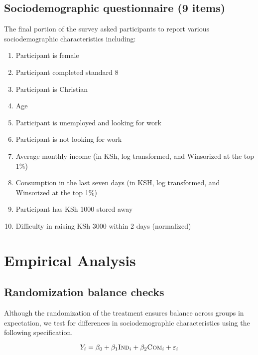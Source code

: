 \documentclass[11pt, a4paper]{article}\usepackage[]{graphicx}\usepackage[]{color}
\begin{document}
    \subsection{Sociodemographic questionnaire (9 items)}

        The final portion of the survey asked participants to report various sociodemographic characteristics including:

        \begin{enumerate}
        \itemsep0em
            \item Participant is female
            \item Participant completed standard 8
            \item Participant is Christian
            \item Age
            \item Participant is unemployed and looking for work
            \item Participant is not looking for work
            \item Average monthly income (in KSh, log transformed, and Winsorized at the top 1\%)
            \item Consumption in the last seven days (in KSH, log transformed, and Winsorized at the top 1\%)
            \item Participant has KSh 1000 stored away
            \item Difficulty in raising KSh 3000 within 2 days (normalized)
        \end{enumerate}

\section{Empirical Analysis}

    \subsection{Randomization balance checks}

        Although the randomization of the treatment ensures balance across groups in expectation, we test for differences in sociodemographic characteristics using the following specification.

        \begin{equation} \label{eq:balance}
        Y_{i} = \beta_{0} + \beta_{1}\text{\textsc{Ind}}_{i} + \beta_{2}\text{\textsc{Com}}_{i} + \varepsilon_{i}
        \end{equation}
\end{document}
